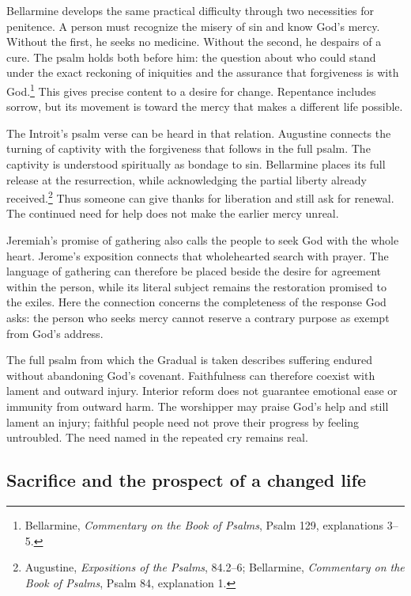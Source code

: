 Bellarmine develops the same practical difficulty through two necessities for penitence. A person must recognize the misery of sin and know God's mercy. Without the first, he seeks no medicine. Without the second, he despairs of a cure. The psalm holds both before him: the question about who could stand under the exact reckoning of iniquities and the assurance that forgiveness is with God.\footnote{Bellarmine, \textit{Commentary on the Book of Psalms}, Psalm 129, explanations 3--5.} This gives precise content to a desire for change. Repentance includes sorrow, but its movement is toward the mercy that makes a different life possible.

The Introit's psalm verse can be heard in that relation. Augustine connects the turning of captivity with the forgiveness that follows in the full psalm. The captivity is understood spiritually as bondage to sin. Bellarmine places its full release at the resurrection, while acknowledging the partial liberty already received.\footnote{Augustine, \textit{Expositions of the Psalms}, 84.2--6; Bellarmine, \textit{Commentary on the Book of Psalms}, Psalm 84, explanation 1.} Thus someone can give thanks for liberation and still ask for renewal. The continued need for help does not make the earlier mercy unreal.

Jeremiah's promise of gathering also calls the people to seek God with the whole heart. Jerome's exposition connects that wholehearted search with prayer. The language of gathering can therefore be placed beside the desire for agreement within the person, while its literal subject remains the restoration promised to the exiles. Here the connection concerns the completeness of the response God asks: the person who seeks mercy cannot reserve a contrary purpose as exempt from God's address.

The full psalm from which the Gradual is taken describes suffering endured without abandoning God's covenant. Faithfulness can therefore coexist with lament and outward injury. Interior reform does not guarantee emotional ease or immunity from outward harm. The worshipper may praise God's help and still lament an injury; faithful people need not prove their progress by feeling untroubled. The need named in the repeated cry remains real.

\subsection{Sacrifice and the prospect of a changed life}

